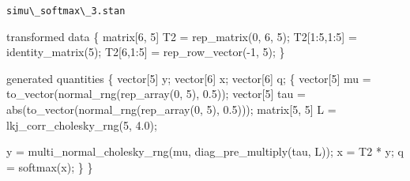 \documentclass[
  letterpaper,
  DIV=11,
  numbers=noendperiod]{scrartcl}
\newenvironment{Shaded}{\begin{snugshade}}{\end{snugshade}}
\newcommand{\AttributeTok}[1]{\textcolor[rgb]{0.40,0.45,0.13}{#1}}
\newcommand{\DataTypeTok}[1]{\textcolor[rgb]{0.68,0.00,0.00}{#1}}
\newcommand{\DecValTok}[1]{\textcolor[rgb]{0.68,0.00,0.00}{#1}}
\newcommand{\FloatTok}[1]{\textcolor[rgb]{0.68,0.00,0.00}{#1}}
\newcommand{\FunctionTok}[1]{\textcolor[rgb]{0.28,0.35,0.67}{#1}}
\newcommand{\KeywordTok}[1]{\textcolor[rgb]{0.00,0.23,0.31}{#1}}
\newcommand{\NormalTok}[1]{\textcolor[rgb]{0.00,0.23,0.31}{#1}}
\newcommand{\OtherTok}[1]{\textcolor[rgb]{0.00,0.23,0.31}{#1}}
\newcommand{\SpecialCharTok}[1]{\textcolor[rgb]{0.37,0.37,0.37}{#1}}
\newcommand{\StringTok}[1]{\textcolor[rgb]{0.13,0.47,0.30}{#1}}
\begin{document}
\begin{codelisting}

\caption{\texttt{simu\textbackslash\_softmax\textbackslash\_3.stan}}

\begin{Shaded}
\begin{Highlighting}[]
\KeywordTok{transformed data}\NormalTok{ \{}
  \DataTypeTok{matrix}\NormalTok{[}\DecValTok{6}\NormalTok{, }\DecValTok{5}\NormalTok{] T2 = rep\_matrix(}\DecValTok{0}\NormalTok{, }\DecValTok{6}\NormalTok{, }\DecValTok{5}\NormalTok{);}
\NormalTok{  T2[}\DecValTok{1}\NormalTok{:}\DecValTok{5}\NormalTok{,}\DecValTok{1}\NormalTok{:}\DecValTok{5}\NormalTok{] = identity\_matrix(}\DecValTok{5}\NormalTok{);}
\NormalTok{  T2[}\DecValTok{6}\NormalTok{,}\DecValTok{1}\NormalTok{:}\DecValTok{5}\NormalTok{] = rep\_row\_vector({-}}\DecValTok{1}\NormalTok{, }\DecValTok{5}\NormalTok{);}
\NormalTok{\}}

\KeywordTok{generated quantities}\NormalTok{ \{}
  \DataTypeTok{vector}\NormalTok{[}\DecValTok{5}\NormalTok{] y;}
  \DataTypeTok{vector}\NormalTok{[}\DecValTok{6}\NormalTok{] x;}
  \DataTypeTok{vector}\NormalTok{[}\DecValTok{6}\NormalTok{] q;}
\NormalTok{  \{}
    \DataTypeTok{vector}\NormalTok{[}\DecValTok{5}\NormalTok{] mu = to\_vector(normal\_rng(rep\_array(}\DecValTok{0}\NormalTok{, }\DecValTok{5}\NormalTok{), }\FloatTok{0.5}\NormalTok{));}
    \DataTypeTok{vector}\NormalTok{[}\DecValTok{5}\NormalTok{] tau = abs(to\_vector(normal\_rng(rep\_array(}\DecValTok{0}\NormalTok{, }\DecValTok{5}\NormalTok{), }\FloatTok{0.5}\NormalTok{)));}
    \DataTypeTok{matrix}\NormalTok{[}\DecValTok{5}\NormalTok{, }\DecValTok{5}\NormalTok{] L = lkj\_corr\_cholesky\_rng(}\DecValTok{5}\NormalTok{, }\FloatTok{4.0}\NormalTok{);}

\NormalTok{    y = multi\_normal\_cholesky\_rng(mu, diag\_pre\_multiply(tau, L));}
\NormalTok{    x = T2 * y;}
\NormalTok{    q = softmax(x);}
\NormalTok{  \}}
\NormalTok{\}}
\end{Highlighting}
\end{Shaded}

\end{codelisting}

\begin{Shaded}
\end{Shaded}
\end{document}
